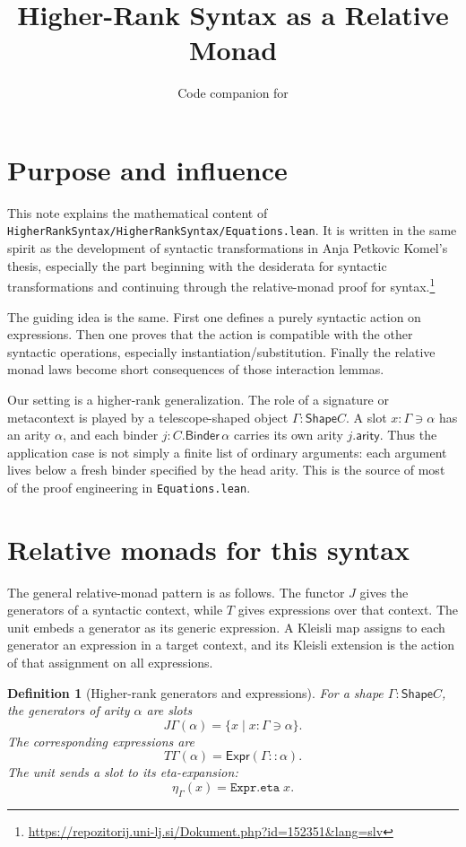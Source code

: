 \documentclass[11pt]{article}
\title{Higher-Rank Syntax as a Relative Monad}
\author{Code companion for \Code{HigherRankSyntax/HigherRankSyntax/Equations.lean}}
\date{}
\newtheorem{definition}{Definition}
\newcommand{\Code}[1]{\texttt{#1}}
\newcommand{\Shape}{\mathsf{Shape}}
\newcommand{\Expr}{\mathsf{Expr}}
\newcommand{\Eta}{\eta}
\newcommand{\cons}{\mathbin{::}}
\begin{document}
\maketitle

\section{Purpose and influence}

This note explains the mathematical content of
\Code{HigherRankSyntax/HigherRankSyntax/Equations.lean}.  It is written in the
same spirit as the development of syntactic transformations in Anja Petkovic
Komel's thesis, especially the part beginning with the desiderata for
syntactic transformations and continuing through the relative-monad proof for
syntax.\footnote{\url{https://repozitorij.uni-lj.si/Dokument.php?id=152351&lang=slv}}

The guiding idea is the same.  First one defines a purely syntactic action on
expressions.  Then one proves that the action is compatible with the other
syntactic operations, especially instantiation/substitution.  Finally the
relative monad laws become short consequences of those interaction lemmas.

Our setting is a higher-rank generalization.  The role of a signature or
metacontext is played by a telescope-shaped object \(\Gamma : \Shape C\).  A
slot \(x : \Gamma \ni \alpha\) has an arity \(\alpha\), and each binder
\(j : C.\mathsf{Binder}\,\alpha\) carries its own arity \(j.\mathsf{arity}\).
Thus the application case is not simply a finite list of ordinary arguments:
each argument lives below a fresh binder specified by the head arity.  This is
the source of most of the proof engineering in \Code{Equations.lean}.

\section{Relative monads for this syntax}

The general relative-monad pattern is as follows.  The functor \(J\) gives the
generators of a syntactic context, while \(T\) gives expressions over that
context.  The unit embeds a generator as its generic expression.  A Kleisli map
assigns to each generator an expression in a target context, and its Kleisli
extension is the action of that assignment on all expressions.

\begin{definition}[Higher-rank generators and expressions]
For a shape \(\Gamma : \Shape C\), the generators of arity \(\alpha\) are slots
\[
  J\Gamma(\alpha) = \{x \mid x : \Gamma \ni \alpha\}.
\]
The corresponding expressions are
\[
  T\Gamma(\alpha) = \Expr(\Gamma \cons \alpha).
\]
The unit sends a slot to its eta-expansion:
\[
  \Eta_\Gamma(x) = \Code{Expr.eta}\;x.
\]
\end{definition}
\end{document}

